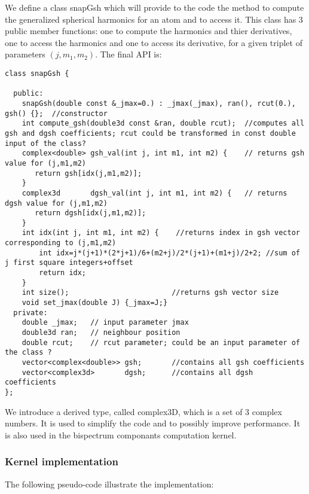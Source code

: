\documentclass[12pt]{article}
\begin{document}
	We define a class snapGsh which will provide to the code the method to compute the generalized spherical harmonics for an atom and to access it. This class has 3 public member functions: one to compute the harmonics and thier derivatives, one to access the harmonics and one to access its derivative, for a given triplet of parameters $\left(j,m_1,m_2\right)$.
        The final API is:
        \begin{lstlisting}
class snapGsh {

  public:
    snapGsh(double const &_jmax=0.) : _jmax(_jmax), ran(), rcut(0.), gsh() {};	//constructor
    int compute_gsh(double3d const &ran, double rcut);	//computes all gsh and dgsh coefficients; rcut could be transformed in const double input of the class?
    complex<double> gsh_val(int j, int m1, int m2) {	// returns gsh value for (j,m1,m2)
       return gsh[idx(j,m1,m2)];
    }
    complex3d       dgsh_val(int j, int m1, int m2) {	// returns dgsh value for (j,m1,m2)
       return dgsh[idx(j,m1,m2)];
    }
    int idx(int j, int m1, int m2) {	//returns index in gsh vector corresponding to (j,m1,m2)
        int idx=j*(j+1)*(2*j+1)/6+(m2+j)/2*(j+1)+(m1+j)/2+2; //sum of j first square integers+offset
        return idx;
    }
    int size();         	           //returns gsh vector size
    void set_jmax(double J) {_jmax=J;}
  private:
    double _jmax;	// input parameter jmax
    double3d ran;	// neighbour position 
    double rcut;	// rcut parameter; could be an input parameter of the class ?
    vector<complex<double>> gsh;       //contains all gsh coefficients 
    vector<complex3d>       dgsh;      //contains all dgsh coefficients
};
        \end{lstlisting}

We introduce a derived type, called complex3D, which is a set of 3 complex numbers. It is used to simplify the code and to possibly improve performance. It is also used in the bispectrum componants computation kernel.

      \subsubsection{Kernel implementation}

        The following pseudo-code illustrate the implementation:
\end{document}
